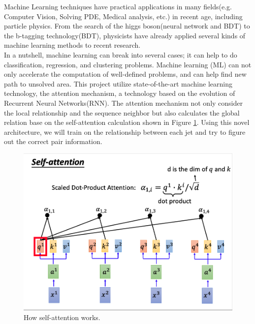 Machine Learning techniques have practical applications in many fields(e.g. Computer Vision, Solving PDE, Medical analysis, etc.) in recent age, including particle physics. From the search of the higgs boson(neural network and BDT) to the b-tagging technology(BDT\cite{Paganini:2017dpd}), physicists have already applied several kinds of machine learning methods to recent research.
\\
In a nutshell, machine learning can break into several cases; it can help to do classification, regression, and clustering problems. Machine learning (ML) can not only accelerate the computation of well-defined problems, and can help find new path to unsolved area. This project utilize state-of-the-art machine learning technology, the attention mechanism\cite{A.Vaswani:2017}, a technology based on the evolution of Recurrent Neural Networks(RNN).\cite{A.Vaswani:2017} The attention mechanism not only consider the local relationship and the sequence neighbor but also calculates the global relation base on the self-attention calculation shown in Figure \ref{fig:attention}. Using this novel architecture, we will train on the relationship between each jet and try to figure out the correct pair information.
\\
\begin{figure}[h]
	\centering
	\includegraphics[width=0.8\linewidth]{Figures/attention.png}
	\caption{How self-attention works.\cite{HY.Lee:2019}}
	\label{fig:attention}
\end{figure}
